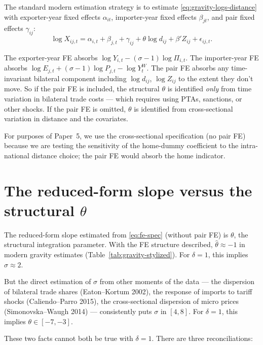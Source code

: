 \documentclass[11pt,letterpaper,oneside]{book}
\theoremstyle{definition}
\theoremstyle{remark}
\begin{document}
The standard modern estimation strategy is to estimate \eqref{eq:gravity-logs-distance} with exporter-year fixed effects $\alpha_{it}$, importer-year fixed effects $\beta_{jt}$, and pair fixed effects $\gamma_{ij}$:
\begin{equation}
\log X_{ij,t} = \alpha_{i,t} + \beta_{j,t} + \gamma_{ij} + \theta \log d_{ij} + \beta' Z_{ij} + \epsilon_{ij,t}.
\label{eq:fe-spec}
\end{equation}

The exporter-year FE absorbs $\log Y_{i,t} - (\sigma-1) \log \Pi_{i,t}$. The importer-year FE absorbs $\log E_{j,t} + (\sigma-1) \log P_{j,t} - \log Y^W_t$. The pair FE absorbs any time-invariant bilateral component including $\log d_{ij}$, $\log Z_{ij}$ to the extent they don't move. So if the pair FE is included, the structural $\theta$ is identified \emph{only} from time variation in bilateral trade costs --- which requires using PTAs, sanctions, or other shocks. If the pair FE is omitted, $\theta$ is identified from cross-sectional variation in distance and the covariates.

For purposes of Paper~5, we use the cross-sectional specification (no pair FE) because we are testing the sensitivity of the home-dummy coefficient to the intra-national distance choice; the pair FE would absorb the home indicator.

\section{The reduced-form slope versus the structural $\theta$}

The reduced-form slope estimated from \eqref{eq:fe-spec} (without pair FE) is $\theta$, the structural integration parameter. With the FE structure described, $\hat{\theta} \approx -1$ in modern gravity estimates (Table~\ref{tab:gravity-stylized}). For $\delta = 1$, this implies $\hat{\sigma} \approx 2$.

But the direct estimation of $\sigma$ from other moments of the data --- the dispersion of bilateral trade shares (Eaton--Kortum 2002), the response of imports to tariff shocks (Caliendo--Parro 2015), the cross-sectional dispersion of micro prices (Simonovska--Waugh 2014) --- consistently puts $\sigma$ in $[4, 8]$. For $\delta = 1$, this implies $\theta \in [-7, -3]$.

These two facts cannot both be true with $\delta = 1$. There are three reconciliations:
\end{document}
